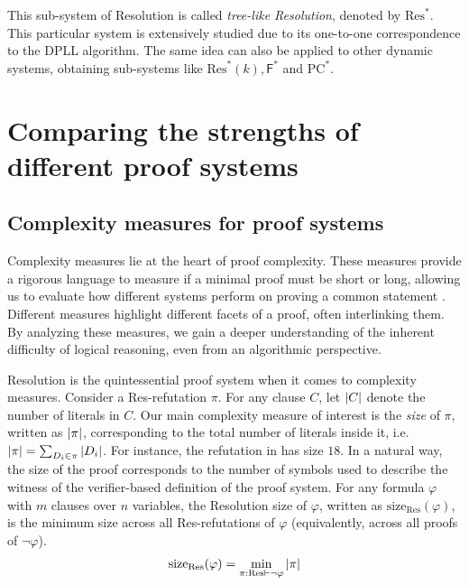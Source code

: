 This sub-system of Resolution is called \textit{tree-like Resolution}, denoted by $\mathrm{Res}^*$. This particular system is extensively studied due to its one-to-one correspondence to the DPLL algorithm. The same idea can also be applied to other dynamic systems, obtaining sub-systems like $\mathrm{Res}^*(k), \mathsf{F}^*$ and $\mathrm{PC}^*$.

\section{Comparing the strengths of different proof systems}

\subsection{Complexity measures for proof systems}
\label{sec:measures}

Complexity measures lie at the heart of proof complexity. These measures provide a rigorous language to measure if a minimal proof must be short or long, allowing us to evaluate how different systems perform on proving a common statement \cite{kraj_book,arora_barak,galesi_toran}. Different measures highlight different facets of a proof, often interlinking them. By analyzing these measures, we gain a deeper understanding of the inherent difficulty of logical reasoning, even from an algorithmic perspective.

Resolution is the quintessential proof system when it comes to complexity measures. Consider a Res-refutation $\pi$. For any clause $C$, let $\left|C\right|$ denote the number of literals in $C$. Our main complexity measure of interest is the \textit{size} of $\pi$, written as $\left|\pi\right|$, corresponding to the total number of literals inside it, i.e. $\left|\pi\right| = \sum_{D_i \in \pi} \left|D_i\right|$. For instance, the refutation in  has size $18$. In a natural way, the size of the proof corresponds to the number of symbols used to describe the witness of the verifier-based definition of the proof system. For any formula $\varphi$ with $m$ clauses over $n$ variables, the Resolution size of $\varphi$, written as $\mathrm{size}_{\mathrm{Res}}(\varphi)$, is the minimum size across all Res-refutations of $\varphi$ (equivalently, across all proofs of $\lnot \varphi$).
\begin{equation}
    \mathrm{size}_{\mathrm{Res}}(\varphi) = \min_{\pi : \mathrm{Res} \vdash \lnot \varphi} \left|\pi\right|
\end{equation}

